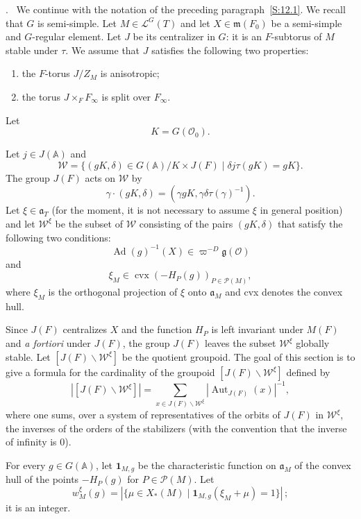 \documentclass[12pt,a4paper,oneside,english,leqno]{smfart}
\makeatletter
\numberwithin{equation}{subsection}
\numberwithin{theo}{subsection}
\newenvironment{paragr}[1][]{\medskip\refstepcounter{subsection}%
  \par\noindent\hspace*{\parindent}\thesubsection.\ \emph{#1}%
  \@ifundefined{@empty}{}{}\ignorespaces}{\medskip}
\theoremstyle{plain}
\theoremstyle{definition}
\theoremstyle{remark}
\DeclareMathOperator{\Ad}{Ad}
\DeclareMathOperator{\Aut}{Aut}
\newcommand{\AAA}{\mathbb{A}}
\newcommand{\oc}{\mathcal{O}}
\newcommand{\wc}{\mathcal{W}}
\newcommand{\lc}{\mathcal{L}}
\newcommand{\pc}{\mathcal{P}}
\newcommand{\ggo}{\mathfrak{g}}
\newcommand{\mgo}{\mathfrak{m}}
\newcommand{\ago}{\mathfrak{a}}
\newcommand{\back}{\backslash}
\makeatother
\begin{document}
\begin{paragr}\label{S:12.2}
We continue with the notation of the preceding paragraph~\ref{S:12.1}. We recall that $G$ is semi-simple. Let $M\in\lc^G(T)$ and let $X\in\mgo(F_0)$ be a semi-simple and $G$-regular element. Let $J$ be its centralizer in $G$: it is an $F$-subtorus of $M$ stable under $\tau$. We assume that $J$ satisfies the following two properties:
\begin{enumerate}
\item the $F$-torus $J/Z_M$ is anisotropic; \item the torus $J\times_F F_\infty$ is split over $F_\infty$.
\end{enumerate}

Let
$$
K=G(\oc_0).
$$

Let $j\in J(\AAA)$ and
$$
\wc=\{(gK,\delta)\in G(\AAA)/K\times J(F)\mid \delta j\tau(gK)=gK\}.
$$
The group $J(F)$ acts on $\wc$ by
$$
\gamma\cdot(gK,\delta)=(\gamma gK,\gamma\delta\tau(\gamma)^{-1}).
$$
Let $\xi\in\ago_T$ (for the moment, it is not necessary to assume $\xi$ in general position) and let $\wc^\xi$ be the subset of $\wc$ consisting of the pairs $(gK,\delta)$ that satisfy the following two conditions:
\begin{equation}\label{eq:12.2.1}
\Ad(g)^{-1}(X)\in\varpi^{-D}\ggo(\oc)
\end{equation}
and
\begin{equation}\label{eq:12.2.2}
\xi_M\in\operatorname{cvx}(-H_P(g))_{P\in\pc(M)},
\end{equation}
where $\xi_M$ is the orthogonal projection of $\xi$ onto $\ago_M$ and cvx denotes the convex hull.

Since $J(F)$ centralizes $X$ and the function $H_P$ is left invariant under $M(F)$ and \emph{a fortiori} under $J(F)$, the group $J(F)$ leaves the subset $\wc^\xi$ globally stable. Let $[J(F)\back\wc^\xi]$ be the quotient groupoid. The goal of this section is to give a formula for the cardinality of the groupoid $[J(F)\back\wc^\xi]$ defined by
\begin{equation}\label{eq:12.2.3}
|[J(F)\back\wc^\xi]|=\sum_{x\in J(F)\back\wc^\xi}|\Aut_{J(F)}(x)|^{-1},
\end{equation}
where one sums, over a system of representatives of the orbits of $J(F)$ in $\wc^\xi$, the inverses of the orders of the stabilizers (with the convention that the inverse of infinity is $0$).

For every $g\in G(\AAA)$, let $\mathbf{1}_{M,g}$ be the characteristic function on $\ago_M$ of the convex hull of the points $-H_P(g)$ for $P\in\pc(M)$. Let
$$
w_M^\xi(g)=|\{\mu\in X_*(M)\mid \mathbf{1}_{M,g}(\xi_M+\mu)=1\}|\,;
$$
it is an integer.


\end{paragr}
\end{document}
